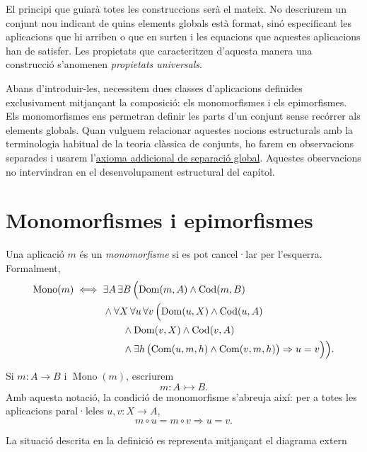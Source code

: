 El principi que guiarà totes les construccions serà el mateix. No descriurem un conjunt nou indicant de quins elements globals està format, sinó especificant les aplicacions que hi arriben o que en surten i les equacions que aquestes aplicacions han de satisfer. Les propietats que caracteritzen d'aquesta manera una construcció s'anomenen \emph{propietats universals}.

Abans d'introduir-les, necessitem dues classes d'aplicacions definides exclusivament mitjançant la composició: els monomorfismes i els epimorfismes. Els monomorfismes ens permetran definir les parts d'un conjunt sense recórrer als elements globals. Quan vulguem relacionar aquestes nocions estructurals amb la terminologia habitual de la teoria clàssica de conjunts, ho farem en observacions separades i usarem l'\hyperref[ax:separacio-globals]{axioma addicional de separació global}. Aquestes observacions no intervindran en el desenvolupament estructural del capítol.

\section{Monomorfismes i epimorfismes}\label{sec:monomorfismes-epimorfismes}

\begin{definicio}[Monomorfisme]\label{def:monomorfisme}
Una aplicació \(m\) és un \emph{monomorfisme} si es pot cancel·lar per l'esquerra. Formalment,
\[
\begin{aligned}
\operatorname{Mono}(m)
\iff {}&
\exists A\,\exists B\,\Bigl(
\operatorname{Dom}(m,A)\land\operatorname{Cod}(m,B)
\\
&{}\land
\forall X\,\forall u\,\forall v\,
\Bigl(
\operatorname{Dom}(u,X)\land\operatorname{Cod}(u,A)
\\
&\qquad{}\land\operatorname{Dom}(v,X)\land\operatorname{Cod}(v,A)
\\
&\qquad{}\land\exists h\,
\bigl(\operatorname{Com}(u,m,h)\land\operatorname{Com}(v,m,h)\bigr)
\Rightarrow u=v
\Bigr)
\Bigr).
\end{aligned}
\]
\end{definicio}

\begin{notacio}\label{not:mono}
Si \(m:A\to B\) i \(\operatorname{Mono}(m)\), escriurem
\[
m:A\rightarrowtail B.
\]
Amb aquesta notació, la condició de monomorfisme s'abreuja així: per a totes les aplicacions paral·leles \(u,v:X\to A\),
\[
m\circ u=m\circ v\Longrightarrow u=v.
\]
\end{notacio}

La situació descrita en la definició es representa mitjançant el diagrama extern


